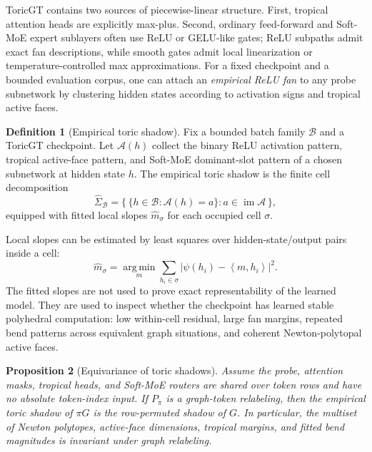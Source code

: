 \documentclass[11pt]{article}
\theoremstyle{definition}
\newtheorem{definition}{Definition}[section]
\theoremstyle{plain}
\newtheorem{proposition}[definition]{Proposition}
\theoremstyle{remark}
\numberwithin{equation}{section}
\newcommand{\argmin}{\operatorname*{arg\,min}}
\newcommand{\abs}[1]{\left\lvert #1\right\rvert}
\newcommand{\ip}[2]{\left\langle #1,#2\right\rangle}
\begin{document}
ToricGT contains two sources of piecewise-linear structure.  First, tropical attention heads are explicitly max-plus.  Second, ordinary feed-forward and Soft-MoE expert sublayers often use ReLU or GELU-like gates; ReLU subpaths admit exact fan descriptions, while smooth gates admit local linearization or temperature-controlled max approximations.  For a fixed checkpoint and a bounded evaluation corpus, one can attach an \emph{empirical ReLU fan} to any probe subnetwork by clustering hidden states according to activation signs and tropical active faces.

\begin{definition}[Empirical toric shadow]
Fix a bounded batch family $\mathcal B$ and a ToricGT checkpoint.  Let $\mathcal A(h)$ collect the binary ReLU activation pattern, tropical active-face pattern, and Soft-MoE dominant-slot pattern of a chosen subnetwork at hidden state $h$.  The empirical toric shadow is the finite cell decomposition
\begin{equation}
  \widehat\Sigma_{\mathcal B}=\{\,\{h\in\mathcal B:\mathcal A(h)=a\}:a\in\operatorname{im}\mathcal A\,\},
\end{equation}
equipped with fitted local slopes $\widehat m_\sigma$ for each occupied cell $\sigma$.
\end{definition}

Local slopes can be estimated by least squares over hidden-state/output pairs inside a cell:
\begin{equation}
  \widehat m_\sigma
  =\argmin_m\sum_{h_i\in\sigma}\abs{\psi(h_i)-\ip{m}{h_i}}^2.
\end{equation}
The fitted slopes are not used to prove exact representability of the learned model.  They are used to inspect whether the checkpoint has learned stable polyhedral computation: low within-cell residual, large fan margins, repeated bend patterns across equivalent graph situations, and coherent Newton-polytopal active faces.

\begin{proposition}[Equivariance of toric shadows]
Assume the probe, attention masks, tropical heads, and Soft-MoE routers are shared over token rows and have no absolute token-index input.  If $P_\pi$ is a graph-token relabeling, then the empirical toric shadow of $\pi G$ is the row-permuted shadow of $G$.  In particular, the multiset of Newton polytopes, active-face dimensions, tropical margins, and fitted bend magnitudes is invariant under graph relabeling.
\end{proposition}
\end{document}
